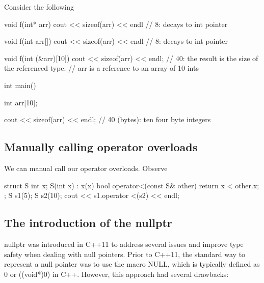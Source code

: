 \documentclass{report}
\begin{document}
\pagebreak 
{}
\bigbreak \noindent 
Consider the following
\bigbreak \noindent 
\begin{cppcode}
    void f(int* arr) {
        cout << sizeof(arr) << endl // 8: decays to int pointer
    }

    void f(int arr[]) {
        cout << sizeof(arr) << endl // 8: decays to int pointer
    }

    void f(int (&arr)[10]) {
        cout << sizeof(arr) << endl; // 40: the result is the size of the referenced type.
        // arr is a reference to an array of 10 ints
    }

    int main() {
        int arr[10];

        cout << sizeof(arr) << endl; // 40 (bytes): ten four byte integers 
    }
\end{cppcode}

\pagebreak 
{}
\bigbreak \noindent 
\subsection{Manually calling operator overloads}
\bigbreak \noindent 
We can manual call our operator overloads. Observe
\bigbreak \noindent 
\begin{cppcode}
    struct S {
        int x{};
        S(int x) : x(x) {}
        bool operator<(const S& other) {
            return x < other.x;
        }
    };
    S s1(5);
    S s2(10);
    cout << s1.operator <(s2) << endl;
\end{cppcode}

\pagebreak 
{}
    \pagebreak 
    \subsection{The introduction of the nullptr}
    \bigbreak \noindent 
    nullptr was introduced in C++11 to address several issues and improve type safety when dealing with null pointers. Prior to C++11, the standard way to represent a null pointer was to use the macro NULL, which is typically defined as 0 or ((void*)0) in C++. However, this approach had several drawbacks:
    \bigbreak \noindent 
\end{document}
